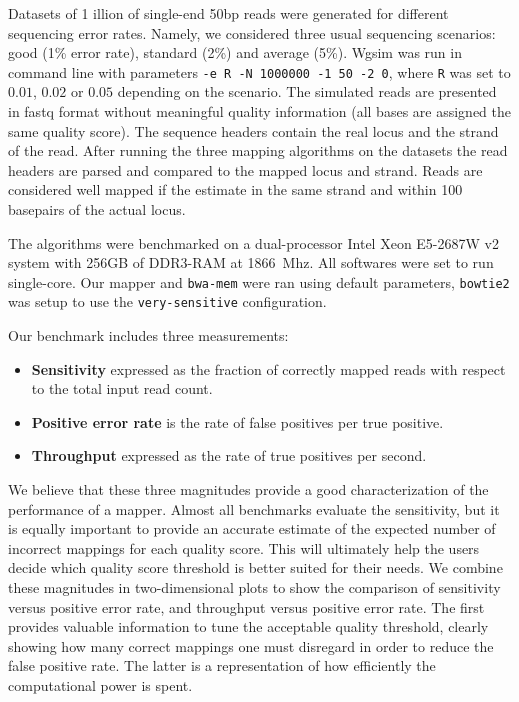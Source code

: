 Datasets of 1 illion of single-end 50bp reads were generated for
different sequencing error rates. Namely, we considered three
usual sequencing scenarios: good (1\% error rate), standard (2\%) and
average (5\%). Wgsim was run in command line with parameters
\texttt{-e R -N 1000000 -1 50 -2 0}, where \texttt{R} was set to
$0.01$, $0.02$ or $0.05$ depending on the scenario. The simulated
reads are presented in fastq format without meaningful quality
information (all bases are assigned the same quality score). The
sequence headers contain the real locus and the strand of the
read. After running the three mapping algorithms on the datasets the
read headers are parsed and compared to the mapped locus and
strand. Reads are considered well mapped if the estimate in the same
strand and within 100 basepairs of the actual locus.

The algorithms were benchmarked on a dual-processor Intel Xeon
E5-2687W v2 system with 256GB of DDR3-RAM at 1866~Mhz. All softwares
were set to run single-core. Our mapper and \texttt{bwa-mem} were ran
using default parameters, \texttt{bowtie2} was setup to use the
\texttt{very-sensitive} configuration. 

Our benchmark includes three measurements:
\begin{itemize}
  \item {\bf Sensitivity} expressed as the fraction of correctly mapped
    reads with respect to the total input read count.
  \item {\bf Positive error rate} is the rate of false positives per true
    positive.
  \item {\bf Throughput} expressed as the rate of true positives per second.
\end{itemize}

We believe that these three magnitudes provide a good characterization
of the performance of a mapper. Almost all benchmarks evaluate the
sensitivity, but it is equally important to provide an accurate
estimate of the expected number of incorrect mappings for each quality
score. This will ultimately help the users decide which quality score
threshold is better suited for their needs. We combine these
magnitudes in two-dimensional plots to show the comparison of
sensitivity versus positive error rate, and throughput versus positive
error rate. The first provides valuable information to tune the
acceptable quality threshold, clearly showing how many correct
mappings one must disregard in order to reduce the false positive
rate. The latter is a representation of how efficiently the
computational power is spent.

